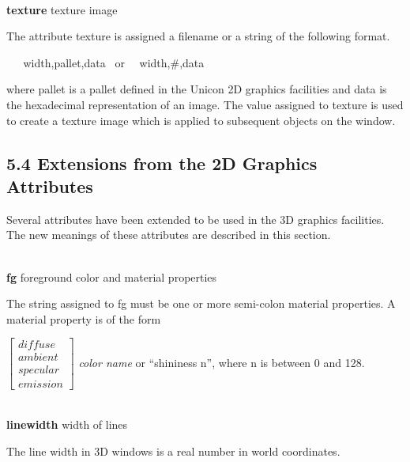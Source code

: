 \documentclass[letterpaper]{article}
\begin{document}
\noindent\hrulefill\\
\noindent\textsf{\textbf{texture}} \hfill texture image


\bigskip

\noindent
The attribute texture is assigned a filename or a string of the
following format.

\texttt{\ \ \ }\textsf{width,pallet,data} \ or \ \ \textsf{width,\#,data}

\noindent
where pallet is a pallet defined in the Unicon 2D graphics facilities and data is the hexadecimal representation of an
image. The value assigned to texture is used to create a texture image which is applied to subsequent objects on the
window.


\subsection[5.4 Extensions from the 2D Graphics Attributes]
{5.4 Extensions from the 2D Graphics Attributes}


\bigskip

{
Several attributes have been extended to be used in the 3D graphics facilities. The new meanings of these attributes are
described in this section. }


\bigskip

\noindent\hrulefill\\
\noindent\textsf{\textbf{fg}} \hfill foreground color and material properties


\bigskip

{
The string assigned to fg must be one or more semi-colon material properties. A material property is of the form }

$\left[
\begin{array}{l}
diffuse\\ambient\\specular\\emission
\end{array}
\right]$ \textsf{\textit{color name}} or \textsf{``shininess n''},
where \textsf{n} is between \textsf{0} and \textsf{128}.


\noindent\hrulefill\\
\noindent\textsf{\textbf{linewidth}} \hfill width of lines

\bigskip

\noindent
The line width in 3D windows is a real number in world coordinates.

\bigskip
\end{document}
